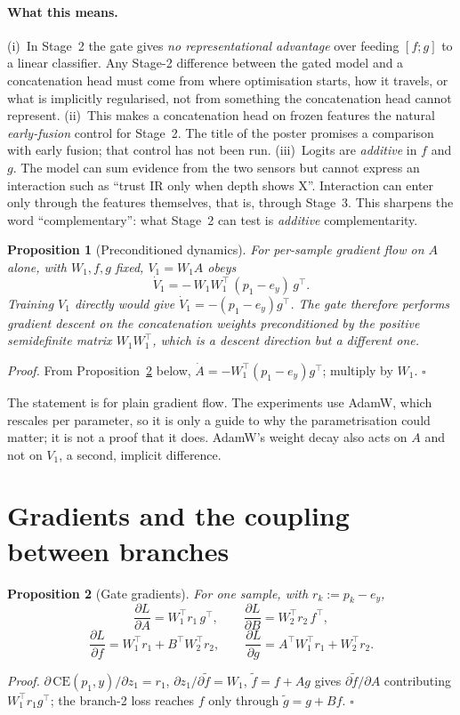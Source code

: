 \documentclass[11pt,a4paper]{article}
\theoremstyle{plain}
\newtheorem{prop}{Proposition}
\theoremstyle{remark}
\newcommand{\CE}{\mathrm{CE}}
\begin{document}
\paragraph{What this means.}
(i)~In Stage~2 the gate gives \emph{no representational advantage} over feeding $[f;g]$ to a linear classifier. Any Stage-2 difference between the gated model and a concatenation head must come from where optimisation starts, how it travels, or what is implicitly regularised, not from something the concatenation head cannot represent. (ii)~This makes a concatenation head on frozen features the natural \emph{early-fusion} control for Stage~2. The title of the poster promises a comparison with early fusion; that control has not been run. (iii)~Logits are \emph{additive} in $f$ and $g$. The model can sum evidence from the two sensors but cannot express an interaction such as ``trust IR only when depth shows X''. Interaction can enter only through the features themselves, that is, through Stage~3. This sharpens the word ``complementary'': what Stage~2 can test is \emph{additive} complementarity.

\begin{prop}[Preconditioned dynamics]\label{prop:precond}
For per-sample gradient flow on $A$ alone, with $W_1,f,g$ fixed, $V_1=W_1A$ obeys
\[
\dot V_1=-\,W_1W_1^\top\,(p_1-e_y)\,g^\top .
\]
Training $V_1$ directly would give $\dot V_1=-(p_1-e_y)g^\top$. The gate therefore performs gradient descent on the concatenation weights preconditioned by the positive semidefinite matrix $W_1W_1^\top$, which is a descent direction but a different one.
\end{prop}
\noindent\emph{Proof.} From Proposition~\ref{prop:grad} below, $\dot A=-W_1^\top(p_1-e_y)g^\top$; multiply by $W_1$. \hfill$\square$

\noindent The statement is for plain gradient flow. The experiments use AdamW, which rescales per parameter, so it is only a guide to why the parametrisation could matter; it is not a proof that it does. AdamW's weight decay also acts on $A$ and not on $V_1$, a second, implicit difference.

\section{Gradients and the coupling between branches}

\begin{prop}[Gate gradients]\label{prop:grad}
For one sample, with $r_k:=p_k-e_y$,
\[
\frac{\partial L}{\partial A}=W_1^\top r_1\,g^\top,\qquad
\frac{\partial L}{\partial B}=W_2^\top r_2\,f^\top,
\]
\[
\frac{\partial L}{\partial f}=W_1^\top r_1+B^\top W_2^\top r_2,\qquad
\frac{\partial L}{\partial g}=A^\top W_1^\top r_1+W_2^\top r_2 .
\]
\end{prop}
\noindent\emph{Proof.} $\partial\,\CE(p_1,y)/\partial z_1=r_1$, $\partial z_1/\partial\tilde f=W_1$, $\tilde f=f+Ag$ gives $\partial\tilde f/\partial A$ contributing $W_1^\top r_1g^\top$; the branch-2 loss reaches $f$ only through $\tilde g=g+Bf$. \hfill$\square$
\end{document}
